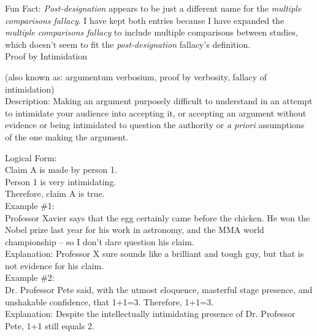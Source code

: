 \documentclass[a4paper,12pt,single,pdftex]{scrartcl}
\begin{document}
    
      Fun Fact: {\em Post-designation} appears to be just a different name for the {\it multiple comparisons fallacy}. I have kept both entries because I have expanded the {\it multiple comparisons fallacy}  to include multiple comparisons between studies, which doesn’t seem to fit the {\em post-designation} fallacy’s definition.
    \\

  

Proof by Intimidation
    
      (also known as: argumentum verbosium, proof by verbosity, fallacy of intimidation)
    \\

  
    Description: Making an argument purposely difficult to understand in an attempt to intimidate your audience into accepting it, or accepting an argument without evidence or being intimidated to question the authority or {\it a priori} assumptions of the one making the argument.

    
      Logical Form:
    \\

    
      Claim A is made by person 1.
    \\

    
      Person 1 is very intimidating.
    \\

    
      Therefore, claim A is true.
    \\

    
      Example \#1:
    \\

    
      Professor Xavier says that the egg certainly came before the chicken.  He won the Nobel prize last year for his work in astronomy, and the MMA world championship -- so I don’t dare question his claim. 
    \\

    
      Explanation: Professor X sure sounds like a brilliant and tough guy, but that is not evidence for his claim.
    \\

    
      Example \#2:
    \\

    
      Dr. Professor Pete said, with the utmost eloquence, masterful stage presence, and unshakable confidence, that 1+1=3.  Therefore, 1+1=3.
    \\

    
      Explanation: Despite the intellectually intimidating presence of Dr. Professor Pete, 1+1 still equals 2.
    \\
\end{document}
